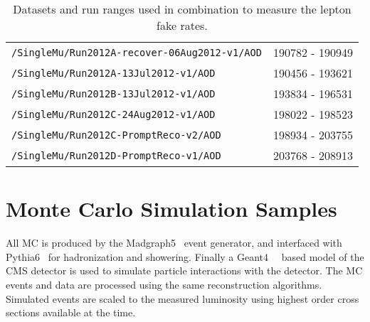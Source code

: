 \begin{table}[hbt]
\begin{center}
\begin{tabular}{lc}
\verb=/SingleMu/Run2012A-recover-06Aug2012-v1/AOD=                    &     190782 - 190949                  \\ 
\verb=/SingleMu/Run2012A-13Jul2012-v1/AOD=                                     &  190456 - 193621                     \\ 
\verb=/SingleMu/Run2012B-13Jul2012-v1/AOD=                                     &  193834 - 196531 \\ 
\verb=/SingleMu/Run2012C-24Aug2012-v1/AOD=                                   &   198022 - 198523                   \\ 
\verb=/SingleMu/Run2012C-PromptReco-v2/AOD=                                  &   198934 - 203755                    \\ 
\verb=/SingleMu/Run2012D-PromptReco-v1/AOD=                                  &  203768 - 208913   \\
 \hline\hline
\end{tabular}
\caption{\label{tab:FRDsets}Datasets and run ranges used in combination to measure the lepton fake rates.}
\end{center}
\end{table}

%


	
	
	
	
\section{Monte Carlo Simulation Samples}
\label{sec:MCSamples}

All MC is produced by the Madgraph5~\cite{Alwall:2011uj} event generator, and interfaced with Pythia6~\cite{pythia6} for hadronization and showering. Finally a Geant4~\cite{geant4applications}~\cite{geant4toolkit} based model of the CMS detector is used to simulate particle interactions with the detector. The MC events and data are processed using the same reconstruction algorithms. Simulated events are scaled to the measured luminosity using highest order cross sections available at the time.

